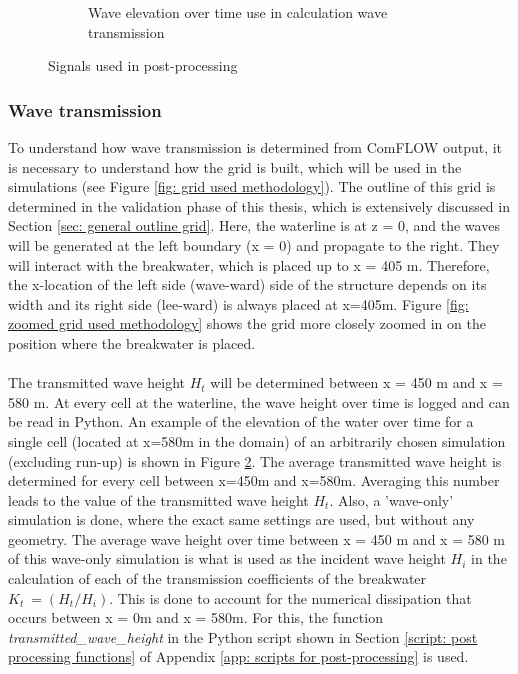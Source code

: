 \begin{figure}[H]
\begin{subfigure}[b]{0.49\textwidth}
        \caption{Wave elevation over time use in calculation wave transmission}
        \label{fig: methodology Kt calculation}
     \end{subfigure}
     \caption{Signals used in post-processing}
\end{figure}

\subsubsection{Wave transmission}
To understand how wave transmission is determined from ComFLOW output, it is necessary to understand how the grid is built, which will be used in the simulations (see Figure \ref{fig: grid used methodology}). The outline of this grid is determined in the validation phase of this thesis, which is extensively discussed in Section \ref{sec: general outline grid}. Here, the waterline is at z = 0, and the waves will be generated at the left boundary (x = 0) and propagate to the right. They will interact with the breakwater, which is placed up to x = 405 m. Therefore, the x-location of the left side (wave-ward) side of the structure depends on its width and its right side (lee-ward) is always placed at x=405m. Figure \ref{fig: zoomed grid used methodology} shows the grid more closely zoomed in on the position where the breakwater is placed. \\
\\
The transmitted wave height $H_t$ will be determined between x = 450 m and x = 580 m. At every cell at the waterline, the wave height over time is logged and can be read in Python. An example of the elevation of the water over time for a single cell (located at x=580m in the domain) of an arbitrarily chosen simulation (excluding run-up) is shown in Figure \ref{fig: methodology Kt calculation}. The average transmitted wave height is determined for every cell between x=450m and x=580m. Averaging this number leads to the value of the transmitted wave height $H_t$. Also, a 'wave-only' simulation is done, where the exact same settings are used, but without any geometry. The average wave height over time between x = 450 m and x = 580 m of this wave-only simulation is what is used as the incident wave height $H_i$ in the calculation of each of the transmission coefficients of the breakwater $K_t~=(H_t/H_i)$. This is done to account for the numerical dissipation that occurs between x = 0m and x = 580m. For this, the function \textit{transmitted\_wave\_height} in the Python script shown in Section \ref{script: post processing functions} of Appendix \ref{app: scripts for post-processing} is used. \\
\\

